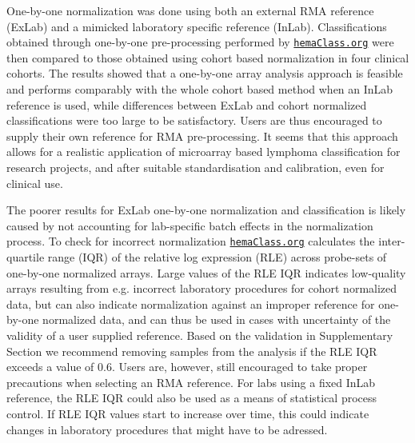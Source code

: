 \documentclass[10pt,letterpaper]{article}
\newcommand{\hemaClass}{\href{http://hemaClass.org}{\texttt{hemaClass.org}}}
\begin{document}
One-by-one normalization was done using both an external RMA reference (ExLab) and a mimicked laboratory specific reference (InLab). Classifications obtained through one-by-one pre-processing performed by \hemaClass{} were then compared to those obtained using cohort based normalization in four clinical cohorts. The results showed that a one-by-one array analysis approach is feasible and performs comparably with the whole cohort based method when an InLab reference is used, while differences between ExLab and cohort normalized classifications were too large to be satisfactory. Users are thus encouraged to supply their own reference for RMA pre-processing. It seems that this approach allows for a realistic application of microarray based lymphoma classification for research projects, and after suitable standardisation and calibration, even for clinical use.

The poorer results for ExLab one-by-one normalization and classification is likely caused by not accounting for lab-specific batch effects in the normalization process. To check for incorrect normalization \hemaClass{} calculates the inter-quartile range (IQR) of the relative log expression (RLE) \mbox{\cite{Bolstad2004b}} across probe-sets of one-by-one normalized arrays. Large values of the RLE IQR indicates low-quality arrays resulting from e.g. incorrect laboratory procedures for cohort normalized data, but can also indicate normalization against an improper reference for one-by-one normalized data, and can thus be used in cases with uncertainty of the validity of a user supplied reference. Based on the validation in Supplementary Section  we recommend removing samples from the analysis if the RLE IQR exceeds a value of $0.6$. Users are, however, still encouraged to take proper precautions when selecting an RMA reference. For labs using a fixed InLab reference, the RLE IQR could also be used as a means of statistical process control. If RLE IQR values start to increase over time, this could indicate changes in laboratory procedures that might have to be adressed.
\end{document}
